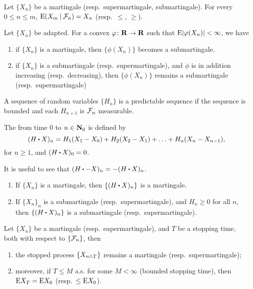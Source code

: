 \begin{xca}
    Let $\{X_n\}$ be a martingale (resp.\ supermartingale, submartingale). For every $0 \leq n \leq m$, $\mathop{}\!\mathrm{E}(X_m \mathbin{|} \mathcal{F}_n) = X_n$ (resp.\ $\leq$, $\geq$).
\end{xca}

\begin{prop}
    Let $\{X_n\}$ be adapted. For a convex $\varphi\colon \mathbf{R} \to \mathbf{R}$ such that $\mathop{}\!\mathrm{E} \lvert \varphi(X_n) \rvert < \infty$, we have \begin{enumerate}
        \item if $\{X_n\}$ is a martingale, then $\{\phi(X_n)\}$ becomes a submartingale.
        \item if $\{X_n\}$ is a submartingale (resp.\ supermartingale), and $\phi$ is in addition increasing (resp.\ decreasing), then $\{\phi(X_n)\}$ remains a submartingale (resp.\ supermartingale)
    \end{enumerate}
\end{prop}

\begin{defn}
    A sequence of random variables $\{H_n\}$ is a predictable sequence if the sequence is bounded and each $H_{n+1}$ is $\mathcal{F}_n$ measurable.
\end{defn}

The  from time $0$ to $n\in \mathbf{N}_0$ is defined by \[
    (H \sbullet X)_{n} = H_1(X_1 - X_0) + H_2(X_2 - X_1) + \dotsc + H_n(X_n - X_{n-1}),
\] for $n \geq 1$, and $(H \sbullet X)_{0} = 0$.

It is useful to see that $(H\sbullet -X)_n = -(H \sbullet X)_n$.

\begin{prop} \leavevmode
\begin{enumerate} 
    \item If $\{X_n\}$ is a martingale, then $\{(H \sbullet X)_n\}$ is a martingale.
    \item If $\{X_n\}_n$ is a submartingale (resp.\ supermartingale), and $H_n \geq 0$ for all $n$, then $\{(H \sbullet X)_n\}$ is a submartingale (resp.\ supermartingale).
\end{enumerate}
\end{prop}

\begin{namedthm} \label{thm:OST-1}
Let $\{X_n\}$ be a martingale (resp.\ supermartingale), and $T$ be a stopping time, both with respect to $\{\mathcal{F}_n\}$, then 
    \begin{enumerate}
        \item the stopped process $\{X_{n \land T}\}$ remains a martingale (resp.\ supermartingale);
        \item moreover, if $T \leq M$ a.s. for some $M < \infty$ (bounded stopping time), then $\mathop{}\!\mathrm{E} X_T = \mathop{}\!\mathrm{E} X_0$ (resp.\ $\leq \mathop{}\!\mathrm{E} X_0$).
    \end{enumerate}
\end{namedthm}

